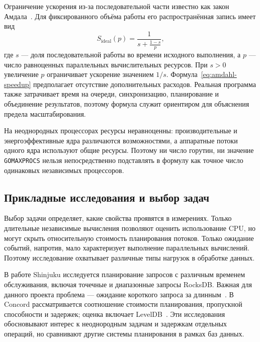 Ограничение ускорения из-за последовательной части известно как закон Амдала~\cite{amdahl1967}.
  Для фиксированного объёма работы его распространённая запись имеет вид
\begin{equation}
  S_{\mathrm{ideal}}(p) = \frac{1}{s + \frac{1-s}{p}},
  \label{eq:amdahl-speedup}
\end{equation}
где $s$ — доля последовательной работы во времени исходного выполнения, а $p$ — число равноценных
  параллельных вычислительных ресурсов. При $s > 0$ увеличение $p$ ограничивает ускорение значением
  $1/s$. Формула~\eqref{eq:amdahl-speedup} предполагает отсутствие дополнительных расходов.
  Реальная программа также затрачивает время на очереди, синхронизацию, планирование и объединение
  результатов, поэтому формула служит ориентиром для объяснения предела масштабирования.

На неоднородных процессорах ресурсы неравноценны: производительные и энергоэффективные ядра
  различаются возможностями, а аппаратные потоки одного ядра используют общие ресурсы.
  Поэтому ни число горутин, ни значение \texttt{GOMAXPROCS} нельзя непосредственно подставлять
  в формулу как точное число одинаковых независимых процессоров.


\subsection{Прикладные исследования и выбор задач}
\label{subsec:workload-rationale}

Выбор задачи определяет, какие свойства проявятся в измерениях. Только длительные
  независимые вычисления позволяют оценить использование CPU, но могут скрыть относительную
  стоимость планирования потоков. Только ожидание событий, напротив, мало характеризует выполнение
  параллельных вычислений. Поэтому исследование охватывает различные типы нагрузок в обработке данных.

В работе Shinjuku исследуется планирование запросов с различным временем обслуживания, включая
  точечные и диапазонные запросы RocksDB. Важная для данного проекта проблема — ожидание короткого
  запроса за длинным~\cite{shinjuku2019}. В Concord рассматривается соотношение стоимости
  планирования, пропускной способности и задержек; оценка включает LevelDB~\cite{concord2023}.
  Эти исследования обосновывают интерес к неоднородным задачам и задержкам отдельных операций,
  но сравнивают другие системы планирования в рамках баз данных.

